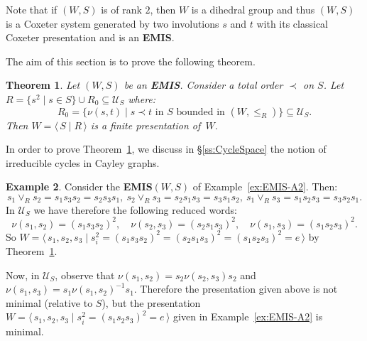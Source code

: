 \documentclass[A4paper, oneside]{amsart}
\newcommand{\id}{\textit{e}}
\newcommand{\mpair}[1]{\langle\, #1\,\rangle}  %
\newcommand{\U}{\mathcal{U}}
\newcommand{\EMIS}{\textnormal{\bf EMIS}\xspace}
\newtheorem{thm}{Theorem}[section]
\theoremstyle{definition}
\newtheorem{ex}[thm]{Example}
\begin{document}
Note that if $(W,S)$ is of rank $2$, then $W$ is a dihedral group and thus $(W,S)$ is a Coxeter system generated by two involutions $s$ and $t$ with its classical Coxeter presentation and is  an \EMIS.



The aim of this section is to prove the following theorem.

\begin{thm}\label{thm:presentationEMIS} Let $(W,S)$ be an {\bf EMIS}.  Consider a total order $\prec$ on $S$. Let $R=\{s^2 \mid s\in S\}\cup R_0\subseteq \U_S$ where:
$$
R_0=\big\{\nu(s,t)\mid s\prec t \textrm{ in $S$ bounded in }(W,\leq_R)\big\}\subseteq \U_S.
$$
Then $W=\mpair{S\mid R}$ is a finite presentation of~$W$.
\end{thm}


In order to prove Theorem~\ref{thm:presentationEMIS}, we discuss in \S\ref{ss:CycleSpace} the notion of irreducible cycles in Cayley graphs. 

\begin{ex} Consider the \EMIS $(W,S)$ of Example~\ref{ex:EMIS-A2}. Then: 
$$
s_1\vee_R s_2= s_1 s_3 s_2=s_2s_3s_1,\ s_2\vee_R s_3= s_2 s_1 s_3=s_3s_1s_2,\ s_1\vee_R s_3= s_1 s_2 s_3=s_3s_2s_1. 
$$
In $\U_S$ we have therefore the following reduced words:
$$
\nu(s_1,s_2)=  (s_1 s_3 s_2)^2, \quad \nu(s_2, s_3)= (s_2 s_1 s_3)^2,\quad \nu(s_1, s_3)= (s_1 s_2 s_3)^2. 
$$
So $W=\mpair{s_1,s_2,s_3\mid s_i^2= (s_1 s_3 s_2)^2= (s_2 s_1 s_3)^2= (s_1 s_2 s_3)^2= \id}$ by Theorem~\ref{thm:presentationEMIS}.

\smallskip\noindent  Now, in $\U_S$, observe that $\nu(s_1,s_2)=s_2\nu(s_2,s_3)s_2$ and $\nu(s_1,s_3)=s_1\nu(s_1,s_2)^{-1}s_1$. Therefore the presentation given above is not minimal (relative to $S$), but the presentation $W=\mpair{s_1,s_2,s_3\mid s_i^2= (s_1 s_2 s_3)^2= \id}$ given in Example~\ref{ex:EMIS-A2} is minimal.
\end{ex}
\end{document}
